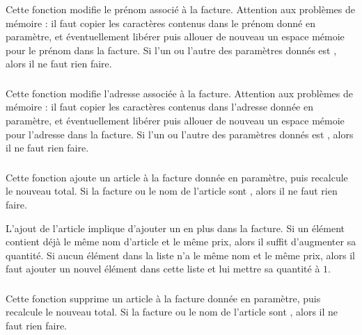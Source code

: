 \noindent Cette fonction modifie le prénom associé à la facture.
Attention aux problèmes de mémoire : il faut copier les caractères contenus dans le prénom donné en paramètre, et éventuellement libérer puis allouer de nouveau un espace mémoie pour le prénom dans la facture.
Si l'un ou l'autre des paramètres donnés est , alors il ne faut rien faire.

\bigskip


\subsubsection*{}

\noindent Cette fonction modifie l'adresse associée à la facture.
Attention aux problèmes de mémoire : il faut copier les caractères contenus dans l'adresse donnée en paramètre, et éventuellement libérer puis allouer de nouveau un espace mémoie pour l'adresse dans la facture.
Si l'un ou l'autre des paramètres donnés est , alors il ne faut rien faire.

\bigskip


\subsubsection*{}

\noindent Cette fonction ajoute un article à la facture donnée en paramètre, puis recalcule le nouveau total.
Si la facture ou le nom de l'article sont , alors il ne faut rien faire.

\noindent L'ajout de l'article implique d'ajouter un  en plus dans la facture.
Si un élément  contient déjà le même nom d'article et le même prix, alors il suffit d'augmenter sa quantité.
Si aucun élément dans la liste n'a le même nom et le même prix, alors il faut ajouter un nouvel élément dans cette liste et lui mettre sa quantité à $ 1 $.

\bigskip


\subsubsection*{}

\noindent Cette fonction supprime un article à la facture donnée en paramètre, puis recalcule le nouveau total.
Si la facture ou le nom de l'article sont , alors il ne faut rien faire.

